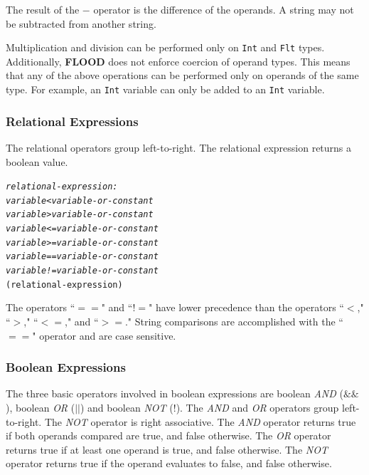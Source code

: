 \documentclass[12pt]{report}
\begin{document}
The result of the $-$ operator is the difference of the operands. A string may not be subtracted from another string.

Multiplication and division can be performed only on \texttt{Int} and \texttt{Flt} types. Additionally, \textbf{FLOOD} does not enforce coercion of operand types. This means that any of the above operations can be performed only on operands of the same type. For example, an \texttt{Int} variable can only be added to an \texttt{Int} variable.

\subsubsection{Relational Expressions}

The relational operators group left-to-right. The relational expression returns a boolean value.

\begin{alltt}\begin{singlespace}
         \textit{relational-expression:}
            \textit{variable < variable-or-constant}
            \textit{variable > variable-or-constant}
            \textit{variable <= variable-or-constant}
            \textit{variable >= variable-or-constant}
            \textit{variable == variable-or-constant}
            \textit{variable != variable-or-constant}
            (relational-expression)\end{singlespace}
\end{alltt}

The operators ``$==$" and ``$!$$=$" have lower precedence than the operators ``$<$," ``$>$," ``$<=$," and ``$>=$." String comparisons are accomplished with the ``$==$" operator and are case sensitive.

\subsubsection{Boolean Expressions}

The three basic operators involved in boolean expressions are boolean \textit{AND} ($\&\&$), boolean \textit{OR} ($||$) and boolean \textit{NOT} ($!$). The \textit{AND} and \textit{OR} operators group left-to-right. The \textit{NOT} operator is right associative. The \textit{AND} operator returns true if both operands compared are true, and false otherwise. The \textit{OR} operator returns true if at least one operand is true, and false otherwise. The \textit{NOT} operator returns true if the operand evaluates to false, and false otherwise.
\end{document}
